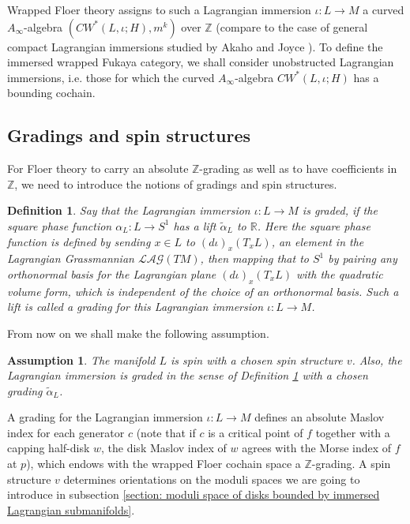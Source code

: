 \documentclass{amsart}
\newtheorem{definition}[theorem]{Definition}
\newtheorem{assumption}[theorem]{Assumption}
\numberwithin{equation}{section}
\numberwithin{figure}{section}
\begin{document}
	Wrapped Floer theory assigns to such a Lagrangian immersion $\iota: L \to M$ a curved $A_{\infty}$-algebra $(CW^{*}(L, \iota; H), m^{k})$ over $\mathbb{Z}$ (compare to the case of general compact Lagrangian immersions studied by Akaho and Joyce \cite{Akaho-Joyce}). To define the immersed wrapped Fukaya category, we shall consider unobstructed Lagrangian immersions, i.e. those for which the curved $A_{\infty}$-algebra $CW^{*}(L, \iota; H)$ has a bounding cochain. \par

\subsection{Gradings and spin structures}
	For Floer theory to carry an absolute $\mathbb{Z}$-grading as well as to have coefficients in $\mathbb{Z}$, we need to introduce the notions of gradings and spin structures. \par

\begin{definition}\label{definition of graded Lagrangian immersion}
	Say that the Lagrangian immersion $\iota: L \to M$ is graded, if the square phase function $\alpha_{L}: L \to S^{1}$ has a lift $\tilde{\alpha}_{L}$ to $\mathbb{R}$. Here the square phase function is defined by sending $x \in L$ to $(d\iota)_{x}(T_{x}L)$, an element in the Lagrangian Grassmannian $\mathcal{LAG}(TM)$, then mapping that to $S^{1}$ by pairing any orthonormal basis for the Lagrangian plane $(d\iota)_{x}(T_{x}L)$ with the quadratic volume form, which is independent of the choice of an orthonormal basis. Such a lift is called a grading for this Lagrangian immersion $\iota: L \to M$. 
\end{definition}

	From now on we shall make the following assumption. \par

\begin{assumption}\label{graded and spin Lagrangian immersions}
	The manifold $L$ is spin with a chosen spin structure $v$. Also, the Lagrangian immersion is graded in the sense of Definition \ref{definition of graded Lagrangian immersion} with a chosen grading $\tilde{\alpha}_{L}$.
\end{assumption}
	
	A grading for the Lagrangian immersion $\iota: L \to M$ defines an absolute Maslov index for each generator $c$ (note that if $c$ is a critical point of $f$ together with a capping half-disk $w$, the disk Maslov index of $w$ agrees with the Morse index of $f$ at $p$), which endows with the wrapped Floer cochain space a $\mathbb{Z}$-grading. A spin structure $v$ determines orientations on the moduli spaces we are going to introduce in subsection \ref{section: moduli space of disks bounded by immersed Lagrangian submanifolds}. \par
\end{document}
